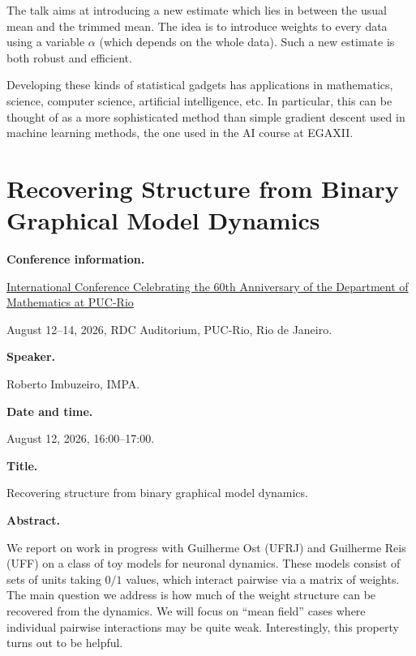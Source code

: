 The talk aims at introducing a new 
estimate which lies in between the 
usual mean and the trimmed mean.
The idea is to introduce weights to every
data using a variable  $\alpha$ (which
depends on the whole data).
Such a new estimate is both robust
and efficient.

Developing these kinds of statistical
gadgets has applications in mathematics,
science, computer science, artificial
intelligence, etc. In particular, this can
be thought of as a more sophisticated method
than simple gradient descent used in machine
learning methods, the one used in the AI
course at EGAXII.

\section{Recovering Structure from Binary
Graphical Model Dynamics}
\label{section-recovering-binary-graphical}

\medskip\noindent
{\bf Conference information.}

\href{%
https://sites.google.com/view/%
60thanniversary-dmat-puc-rio/Home
}{International Conference Celebrating
the 60th Anniversary of the Department
of Mathematics at PUC-Rio}

August 12--14, 2026,
RDC Auditorium, PUC-Rio,
Rio de Janeiro.

\medskip\noindent
{\bf Speaker.}

Roberto Imbuzeiro, IMPA.

\medskip\noindent
{\bf Date and time.}

August 12, 2026, 16:00--17:00.

\medskip\noindent
{\bf Title.}

Recovering structure from binary
graphical model dynamics.

\medskip\noindent
{\bf Abstract.}

We report on work in progress with
Guilherme Ost (UFRJ) and Guilherme Reis
(UFF) on a class of toy models for
neuronal dynamics. These models consist
of sets of units taking $0/1$ values,
which interact pairwise via a matrix of
weights. The main question we address is
how much of the weight structure can be
recovered from the dynamics. We will
focus on ``mean field'' cases where
individual pairwise interactions may be
quite weak. Interestingly, this property
turns out to be helpful.

